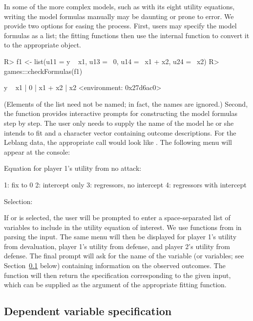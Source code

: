 \documentclass[article]{jss}
\begin{document}
In some of the more complex models, such as  with its eight
utility equations, writing the model formulas manually may be daunting or prone
to error.  We provide two options for easing the process.  First, users may
specify the model formulas as a list; the fitting functions then use the
internal function  to convert it to the appropriate
 object.
\begin{Schunk}
\begin{Sinput}
R> f1 <- list(u11 = y ~ x1, u13 = ~0, u14 = ~x1 + x2, u24 = ~x2)
R> games:::checkFormulas(f1)
\end{Sinput}
\begin{Soutput}
y ~ x1 | 0 | x1 + x2 | x2
<environment: 0x27d6ac0>
\end{Soutput}
\end{Schunk}
(Elements of the list need not be named; in fact, the names are ignored.)
Second, the function  provides interactive prompts for
constructing the model formulas step by step.  The user only needs to supply the
name of the model he or she intends to fit and a character vector containing
outcome descriptions.  For the Leblang data, the appropriate call would look
like .  The following menu will appear at the  console:
\begin{Code}
Equation for player 1's utility from no attack: 

1: fix to 0
2: intercept only
3: regressors, no intercept
4: regressors with intercept

Selection: 
\end{Code}
If  or  is selected, the user will be prompted to enter a
space-separated list of variables to include in the utility equation of
interest.  We use functions from  \citep{stringrpkg} in parsing the
input.  The same menu will then be displayed for player 1's utility from
devaluation, player 1's utility from defense, and player 2's utility from
defense.  The final prompt will ask for the name of the variable (or variables;
see Section~\ref{sec:dep} below) containing information on the observed
outcomes.  The function will then return the  specification
corresponding to the given input, which can be supplied as the 
argument of the appropriate fitting function.

\subsection{Dependent variable specification}
\label{sec:dep}
\end{document}
